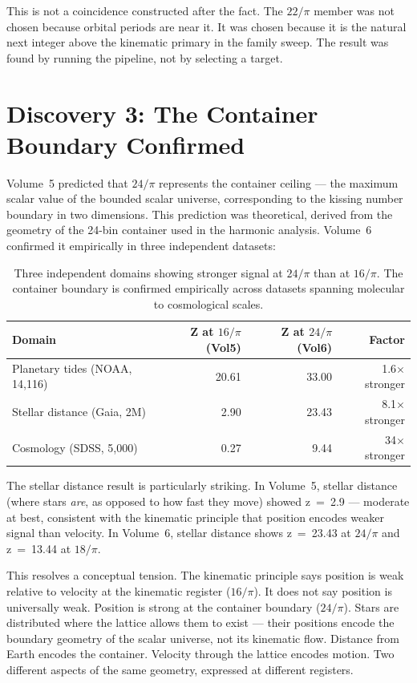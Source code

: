 \documentclass[11pt, letterpaper, openany]{book}
\begin{document}
This is not a coincidence constructed after the fact. The $22/\pi$ member was not chosen because orbital periods are near it.
It was chosen because it is the natural next integer above the kinematic primary in the family sweep.
The result was found by running the pipeline, not by selecting a target.

\section*{Discovery 3: The Container Boundary Confirmed}

Volume~5 predicted that $24/\pi$ represents the container ceiling --- the maximum scalar value of the bounded scalar universe, corresponding to the kissing number boundary in two dimensions.
This prediction was theoretical, derived from the geometry of the 24-bin container used in the harmonic analysis.
Volume~6 confirmed it empirically in three independent datasets:

\begin{table}[H]
\centering
\renewcommand{\arraystretch}{1.3}
\begin{tabular}{|l|r|r|r|}
\hline
\textbf{Domain} & \textbf{Z at $16/\pi$ (Vol5)} & \textbf{Z at $24/\pi$ (Vol6)} & \textbf{Factor} \\
\hline\hline
Planetary tides (NOAA, 14,116) & 20.61 & 33.00 & 1.6$\times$ stronger \\
Stellar distance (Gaia, 2M) & 2.90 & 23.43 & 8.1$\times$ stronger \\
Cosmology (SDSS, 5,000) & 0.27 & 9.44 & 34$\times$ stronger \\
\hline
\end{tabular}
\caption{Three independent domains showing stronger signal at $24/\pi$ than at $16/\pi$.
The container boundary is confirmed empirically across datasets spanning molecular to cosmological scales.}
\label{tab:boundary}
\end{table}

The stellar distance result is particularly striking.
In Volume~5, stellar distance (where stars \emph{are}, as opposed to how fast they move) showed z~=~2.9 --- moderate at best, consistent with the kinematic principle that position encodes weaker signal than velocity.
In Volume~6, stellar distance shows z~=~23.43 at $24/\pi$ and z~=~13.44 at $18/\pi$.

This resolves a conceptual tension.
The kinematic principle says position is weak relative to velocity at the kinematic register ($16/\pi$).
It does not say position is universally weak. Position is strong at the container boundary ($24/\pi$).
Stars are distributed where the lattice allows them to exist --- their positions encode the boundary geometry of the scalar universe, not its kinematic flow.
Distance from Earth encodes the container. Velocity through the lattice encodes motion.
Two different aspects of the same geometry, expressed at different registers.
\end{document}
